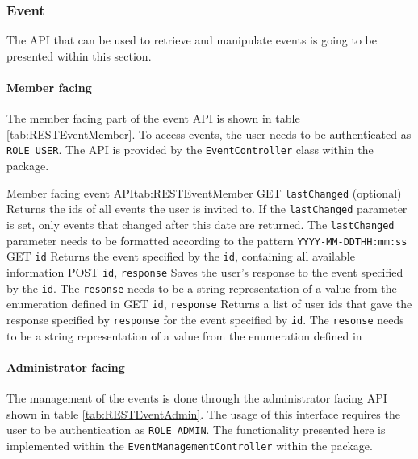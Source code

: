 \subsubsection{Event}

The \gls{API} that can be used to retrieve and manipulate events is going to be presented within this section. 

\paragraph{Member facing}
The member facing part of the event \gls{API} is shown in table \vref{tab:RESTEventMember}. To access events, the user needs to be authenticated as \texttt{ROLE\_USER}. The \gls{API} is provided by the \texttt{EventController} class within the  package.

\begin{RESTTable}{Member facing event API}{tab:RESTEventMember}
		{GET}
		{\texttt{lastChanged} (optional)}
		{Returns the ids of all events the user is invited to. If the \texttt{lastChanged} parameter is set, only events that changed after this date are returned. The \texttt{lastChanged} parameter needs to be formatted according to the pattern \texttt{YYYY-MM-DDTHH:mm:ss}}
		{GET}
		{\texttt{id}}
		{Returns the event specified by the \texttt{id}, containing all available information}
		{POST}
		{\texttt{id}, \texttt{response}}
		{Saves the user's response to the event specified by the \texttt{id}. The \texttt{resonse} needs to be a string representation of a value from the enumeration defined in }
		{GET}
		{\texttt{id}, \texttt{response}}
		{Returns a list of user ids that gave the response specified by \texttt{response} for the event specified by \texttt{id}. The \texttt{resonse} needs to be a string representation of a value from the enumeration defined in }
\end{RESTTable}

\paragraph{Administrator facing}
The management of the events is done through the administrator facing \gls{API} shown in table \vref{tab:RESTEventAdmin}. The usage of this interface requires the user to be authentication as \texttt{ROLE\_ADMIN}. The functionality presented here is implemented within the \texttt{EventManagementController} within the  package.

